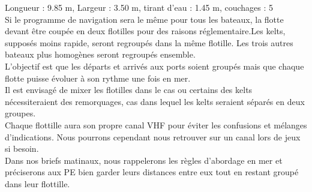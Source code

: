 \begin{minipage}[c][\textheight][t]{0.55\textwidth}
{                \textbullet \hspace{0.2cm} Longueur : 9.85 m, \hspace{0.3cm} 
                \textbullet \hspace{0.2cm} Largeur : 3.50 m, \hspace{0.3cm} 
                \textbullet \hspace{0.2cm} tirant d'eau : 1.45 m, \hspace{0.3cm}    
                \textbullet \hspace{0.2cm} couchages : 5
            }\vspace{0.3cm}\\
            Si le programme de navigation sera le même pour tous les bateaux, la flotte devant être coupée en deux flotilles pour des raisons réglementaire.Les kelts, supposés moins rapide, seront regroupés dans la même flotille. Les trois autres bateaux plus homogènes seront regroupés ensemble. \\
            L'objectif est que les départs et arrivés aux ports soient groupés mais que chaque flotte puisse évoluer à son rythme une fois en mer.\\
            Il est envisagé de mixer les flotilles dans le cas ou certains des kelts nécessiteraient des remorquages, cas dans lequel les kelts seraient séparés en deux groupes. \\  
            Chaque flottille aura son propre canal VHF pour éviter les confusions et mélanges d’indications. Nous pourrons cependant nous retrouver sur un canal lors de jeux si besoin. \\
            Dans nos briefs matinaux, nous rappelerons les règles d’abordage en mer et préciserons aux PE bien garder leurs distances entre eux tout en restant groupé dans leur flottille.  

\end{minipage}%

